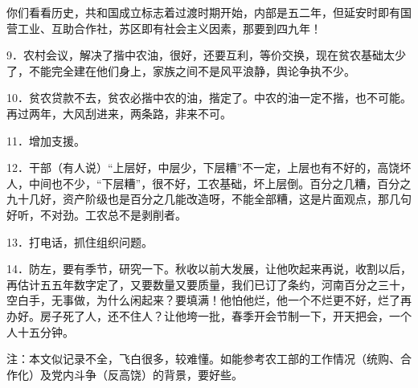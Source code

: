 你们看看历史，共和国成立标志着过渡时期开始，内部是五二年，但延安时即有国营工业、互助合作社，苏区即有社会主义因素，那要到四九年！

9．农村会议，解决了揩中农油，很好，还要互利，等价交换，现在贫农基础太少了，不能完全建在他们身上，家族之间不是风平浪静，舆论争执不少。

10．贫农贷款不去，贫农必揩中农的油，揩定了。中农的油一定不揩，也不可能。再过两年，大风刮进来，两条路，非来不可。

11．增加支援。

12．干部（有人说）“上层好，中层少，下层糟”不一定，上层也有不好的，高饶坏人，中间也不少，“下层糟”，很不好，工农基础，坏上层倒。百分之几糟，百分之九十几好，资产阶级也是百分之几能改造呀，不能全部糟，这是片面观点，那几句好听，不对劲。工农总不是剥削者。

13．打电话，抓住组织问题。

14．防左，要有季节，研究一下。秋收以前大发展，让他吹起来再说，收割以后，再估计五五年数字定了，又要数量又要质量，我们已订了条约，河南百分之三十，空白手，无事做，为什么闲起来？要填满！他怕他烂，他一个不烂更不好，烂了再办好。房子死了人，还不住人？让他垮一批，春季开会节制一下，开天把会，一个人十五分钟。

注：本文似记录不全，飞白很多，较难懂。如能参考农工部的工作情况（统购、合作化）及党内斗争（反高饶）的背景，要好些。


